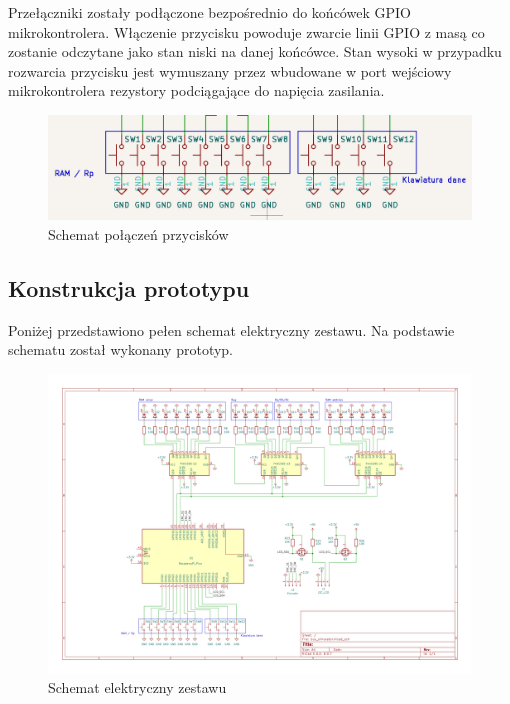 \documentclass[../main.tex]{subfiles}
\begin{document}
Przełączniki zostały podłączone bezpośrednio do końcówek GPIO mikrokontrolera. Włączenie przycisku powoduje zwarcie linii GPIO z masą
co zostanie odczytane jako stan niski na danej końcówce. Stan wysoki w przypadku rozwarcia przycisku jest  wymuszany przez wbudowane
w port wejściowy mikrokontrolera rezystory podciągające do napięcia zasilania.

\begin{figure}[H]
    \centering
    \includegraphics[width=\linewidth]{button_schemat.png}
    \caption{Schemat połączeń przycisków}
    \label{fig:button_connection}
\end{figure}

\subsection{Konstrukcja prototypu}

Poniżej przedstawiono pełen schemat elektryczny zestawu. Na podstawie schematu został wykonany prototyp.

\begin{figure}[H]
    \centering
    \includegraphics[width=\linewidth]{schemat.png}
    \caption{Schemat elektryczny zestawu}
    \label{fig:electrical_schematic}
\end{figure}
\end{document}
